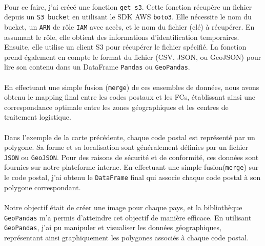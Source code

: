 \paragraph{}
\vspace{-2em}
Pour ce faire, j'ai créeé une fonction \texttt{get\_s3}. Cette fonction récupère un fichier depuis un \texttt{S3 bucket} en utilisant le SDK AWS \texttt{boto3}. Elle nécessite le nom du {bucket}, un \texttt{ARN} de rôle \texttt{IAM} avec accès, et le nom du fichier (clé) à récupérer. En assumant le rôle, elle obtient des informations d'identification temporaires. Ensuite, elle utilise un client S3 pour récupérer le fichier spécifié. La fonction prend également en compte le format du fichier (CSV, JSON, ou GeoJSON) pour lire son contenu dans un DataFrame \texttt{Pandas} ou \texttt{GeoPandas}. 

\paragraph{}
\vspace{-2em}
En effectuant une simple fusion (\texttt{merge}) de ces ensembles de données, nous avons obtenu le mapping final entre les codes postaux et les FCs, établissant ainsi une correspondance optimale entre les zones géographiques et les centres de traitement logistique. 
\paragraph{}
\vspace{-2em}
Dans l'exemple de la carte précédente, chaque code postal est représenté par un polygone. Sa forme et sa localisation sont généralement définies par un fichier \texttt{JSON} ou \texttt{GeoJSON}. Pour des raisons de sécurité et de conformité, ces données sont fournies sur notre plateforme interne. En effectuant une simple fusion(\texttt{merge}) sur le code postal, j'ai obtenu le \texttt{DataFrame} final qui associe chaque code postal à son polygone correspondant.

\paragraph{}
\vspace{-2em}
Notre objectif était de créer une image pour chaque pays, et la bibliothèque \texttt{GeoPandas} m'a permis d'atteindre cet objectif de manière efficace. En utilisant \texttt{GeoPandas}, j'ai pu manipuler et visualiser les données géographiques, représentant ainsi graphiquement les polygones associés à chaque code postal. 

